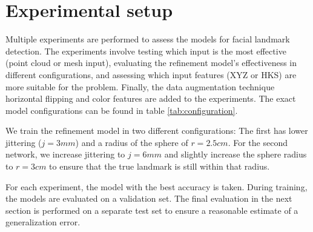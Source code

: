 \documentclass[class=article, crop=false]{standalone}
\begin{document}
\twocolumn

\section{Experimental setup}\label{sec:exp_setup}


Multiple experiments are performed to assess the models for facial landmark detection. The experiments involve testing which input is the most effective (point cloud or mesh input), evaluating the refinement model's effectiveness in different configurations, and assessing which input features (XYZ or HKS) are more suitable for the problem. Finally, the data augmentation technique horizontal flipping and color features are added to the experiments. The exact model configurations can be found in table \ref{tab:configuration}.

We train the refinement model in two different configurations: The first has lower jittering ($j=3mm$) and a radius of the sphere of $r=2.5cm$. For the second network, we increase jittering to $j=6mm$ and slightly increase the sphere radius to $r=3cm$ to ensure that the true landmark is still within that radius.  

For each experiment, the model with the best accuracy is taken. During training, the models are evaluated on a validation set. The final evaluation in the next section is performed on a separate test set to ensure a reasonable estimate of a generalization error.
\end{document}
